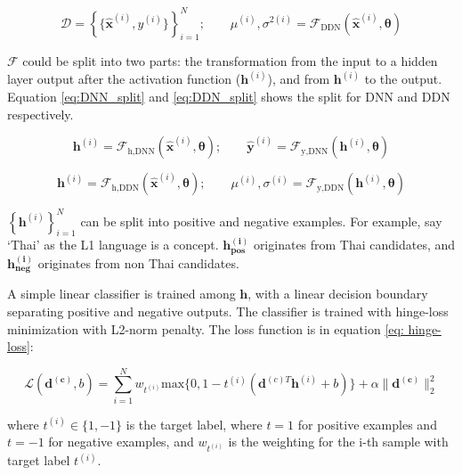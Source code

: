 \begin{equation} \label{eq:DDN}
    \mathcal{D} = \left\{\{\mathbf{\hat{x}}^{(i)},y^{(i)}\}\right\}_{i=1}^{N}; \qquad \mu^{(i)}, \sigma^{2(i)} = \mathcal{F}_{\text{DDN}}(\mathbf{\hat{x}}^{(i)}, \boldsymbol{\theta})
\end{equation}

$\mathcal{F}$ could be split into two parts: the transformation from the input to a hidden layer output after the activation function ($\mathbf{h}^{(i)}$), and from $\mathbf{h}^{(i)}$ to the output. Equation \ref{eq:DNN_split} and \ref{eq:DDN_split} shows the split for DNN and DDN respectively.

\begin{equation} \label{eq:DNN_split}
    \mathbf{h}^{(i)} = \mathcal{F}_{\text{h,DNN}}(\mathbf{\hat{x}}^{(i)}, \boldsymbol{\theta}); \qquad \mathbf{\hat{y}}^{(i)} = \mathcal{F}_{\text{y,DNN}}(\mathbf{h}^{(i)}, \boldsymbol{\theta})
\end{equation}

\begin{equation} \label{eq:DDN_split}
    \mathbf{h}^{(i)} = \mathcal{F}_{\text{h,DDN}}(\mathbf{\hat{x}}^{(i)}, \boldsymbol{\theta}); \qquad \mu^{(i)}, \sigma^{(i)} = \mathcal{F}_{\text{y,DDN}}(\mathbf{h}^{(i)}, \boldsymbol{\theta})
\end{equation}

$\left\{ \mathbf{h}^{(i)} \right\}_{i=1}^N$ can be split into positive and negative examples. For example, say `Thai' as the L1 language is a concept. $\boldsymbol{h_{pos}^{(i)}}$ originates from Thai candidates, and $\boldsymbol{h_{neg}^{(i)}}$ originates from non Thai candidates.

A simple linear classifier is trained among $\boldsymbol{h}$, with a linear decision boundary separating positive and negative outputs. The classifier is trained with hinge-loss minimization with L2-norm penalty. The loss function is in equation \ref{eq: hinge-loss}:

\begin{equation} \label{eq: hinge-loss}
    \mathcal{L}(\boldsymbol{d^{(c)}}, b) = \sum_{i=1}^{N} w_{t^(i)} \mathrm{max} \{0, 1 - t^{(i)}(\boldsymbol{d}^{(c)T}\boldsymbol{h}^{(i)} + b)\} + \alpha \|\boldsymbol{d^{(c)}}\|_2^2
\end{equation}

where $t^{(i)} \in \{1, -1\}$ is the target label, where $t = 1$ for positive examples and $t = -1$ for negative examples, and $w_{t^{(i)}}$ is the weighting for the i-th sample with target label $t^{(i)}$.

